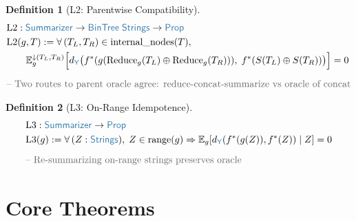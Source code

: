 \documentclass[11pt]{article}
\theoremstyle{definition}
\newtheorem{defnenv}{Definition}
\theoremstyle{plain}
\newcommand{\ty}[1]{\textcolor{type}{\mathsf{#1}}}
\newcommand{\fn}[1]{\mathrm{#1}}
\newcommand{\cmt}[1]{\textcolor{comment}{\text{-- #1}}}
\newcommand{\all}{\forall\,}
\newcommand{\arr}{\to}
\newcommand{\Arr}{\Rightarrow}
\newcommand{\defeq}{:=}
\newcommand{\Strings}{\ty{Strings}}
\newcommand{\Y}{\ty{Y}}
\newcommand{\Prop}{\ty{Prop}}
\newcommand{\fstar}{f^*}
\newcommand{\dY}{d_{\Y}}
\newcommand{\concat}{\oplus}
\newcommand{\Eg}{\mathbb{E}_g}
\newcommand{\Egu}[1]{\mathbb{E}_g^{\downarrow #1}}
\newcommand{\reduce}{\fn{Reduce}_g}
\begin{document}
\begin{defnenv}[L2: Parentwise Compatibility]
\label{def:L2}
\begin{align*}
&\fn{L2} : \ty{Summarizer} \arr \ty{BinTree}\;\Strings \arr \Prop \\
&\fn{L2}(g, T) \defeq \all (T_L, T_R) \in \fn{internal\_nodes}(T),\; \\
&\quad\quad \Egu{(T_L,T_R)}\Big[\dY\big(\fstar(g(\reduce(T_L) \concat \reduce(T_R))),\; \fstar(S(T_L) \concat S(T_R))\big)\Big] = 0 \\[6pt]
&\cmt{Two routes to parent oracle agree: reduce-concat-summarize vs oracle of concat}
\end{align*}
\end{defnenv}

\begin{defnenv}[L3: On-Range Idempotence]
\label{def:L3}
\begin{align*}
&\fn{L3} : \ty{Summarizer} \arr \Prop \\
&\fn{L3}(g) \defeq \all (Z : \Strings),\; Z \in \fn{range}(g) \Arr \Eg[\dY(\fstar(g(Z)), \fstar(Z)) \mid Z] = 0 \\[6pt]
&\cmt{Re-summarizing on-range strings preserves oracle}
\end{align*}
\end{defnenv}

\section{Core Theorems}
\label{sec:core}
\end{document}
